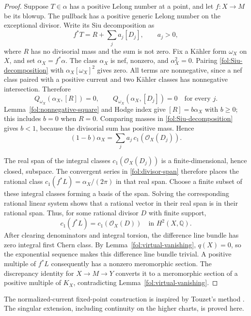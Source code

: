 \documentclass[11pt,letterpaper]{article}
\newcommand{\Q}{\mathbb{Q}}
\newcommand{\OO}{\mathcal{O}}
\theoremstyle{definition}
\theoremstyle{remark}
\begin{document}
\begin{proof}
Suppose $T\in\alpha$ has a positive Lelong number at a point, and let
$f\colon X\to M$ be its blowup.  The pullback has a positive generic
Lelong number on the exceptional divisor.  Write its Siu decomposition
as
\begin{equation}\label{fol:Siu-decomposition}
 f^*T=R+\sum_j a_j[D_j],
 \qquad a_j>0,
\end{equation}
where $R$ has no divisorial mass and the sum is not zero.
Fix a K\"ahler form $\omega_X$ on $X$, and set $\alpha_X=f^*\alpha$.
The class $\alpha_X$ is nef, nonzero, and
$\alpha_X^2=0$.  Pairing \eqref{fol:Siu-decomposition} with
$\alpha_X[\omega_X]^2$ gives zero.  All terms are nonnegative,
since a nef class paired with a positive current and two K\"ahler
classes has nonnegative intersection.  Therefore
\[
 Q_{\omega_X}(\alpha_X,[R])=0,\qquad
 Q_{\omega_X}(\alpha_X,[D_j])=0
 \quad\text{for every }j.
\]
Lemma~\ref{fol:nonnegative-square} and Hodge index give
$[R]=b\alpha_X$ with $b\geq0$; this includes $b=0$ when $R=0$.
Comparing masses in \eqref{fol:Siu-decomposition} gives $b<1$,
because the divisorial sum has positive mass.  Hence
\begin{equation}\label{fol:divisor-span}
 (1-b)\alpha_X=\sum_j a_j\,c_1(\OO_X(D_j)).
\end{equation}

The real span of the integral classes $c_1(\OO_X(D_j))$ is a
finite-dimensional, hence closed, subspace.  The convergent series in
\eqref{fol:divisor-span} therefore places the rational class
$c_1(f^*L)=\alpha_X/(2\pi)$ in that real span.  Choose a finite subset
of these integral classes forming a basis of the span.  Solving the
corresponding rational linear system shows that a rational vector in
their real span is in their rational span.  Thus, for some rational
divisor $D$ with finite support,
\[
 c_1(f^*L)=c_1(\OO_X(D))
 \quad\text{in }H^2(X,\Q).
\]
After clearing denominators and integral torsion, the difference line
bundle has zero integral first Chern class.  By
Lemma~\ref{fol:virtual-vanishing}, $q(X)=0$, so the exponential sequence
makes this difference line bundle trivial.  A positive multiple of
$f^*L$ consequently has a nonzero meromorphic section.  The discrepancy
identity for $X\to M\to Y$ converts it to a meromorphic section of a
positive multiple of $K_X$, contradicting
Lemma~\ref{fol:virtual-vanishing}.
\end{proof}

The normalized-current fixed-point construction is inspired by Touzet's
method \cite{Touzet2014}.  The singular extension, including continuity
on the higher charts, is proved here.
\end{document}
